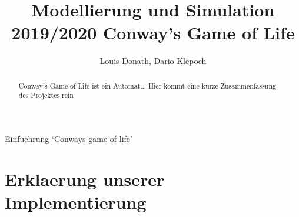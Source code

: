 \documentclass[runningheads]{llncs}
\begin{document}
%
\title{Modellierung und Simulation 2019/2020 Conway's Game of Life}
\author{Louis Donath, Dario Klepoch}
%
\authorrunning{}


\maketitle              

\begin{abstract}
Conway's Game of Life ist ein Automat...
Hier kommt eine kurze Zusammenfassung des Projektes rein
\end{abstract}
%

\begin{section}{Einfuehrung}
    `Conways game of life' 
\end{section}

\section{Erklaerung unserer Implementierung}
    
\end{document}

